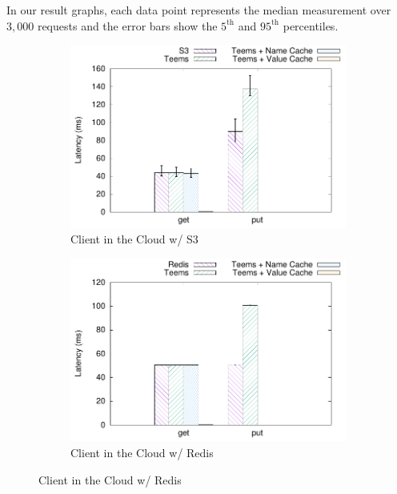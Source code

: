 In our result graphs, each data point represents the median
measurement over $3,000$ requests and the error bars show the $5^{\text{th}}$ and
$95^{\text{th}}$ percentiles.

\begin{figure}[t]
    \centering
    \begin{subfigure}[t]{0.24 * 10cm}
        \centering
        \includegraphics[width=\linewidth]{teem_results/deployment/result/client_cloud_s3}
        \caption{Client in the Cloud w/ S3}\label{fig:cloud_client_s3}
    \end{subfigure}
    \begin{subfigure}[t]{0.24 * 10cm}
        \centering
        \includegraphics[width=\linewidth]{teem_results/deployment/result/client_cloud_redis}
        \caption{Client in the Cloud w/ Redis}\label{fig:cloud_client_remote_redis}
    \end{subfigure}

\end{figure}
